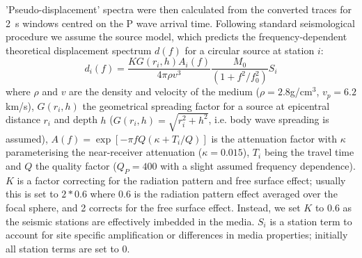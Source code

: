 \documentclass[reviewcopy]{elsart}
\begin{document}
'Pseudo-displacement' spectra were then calculated from the converted traces for 2~s windows
centred on the P wave arrival time.  Following standard seismological
procedure we assume the \citet{brune70} source model, which predicts
the frequency-dependent theoretical displacement spectrum $d(f)$ for a circular source at
station $i$:
\begin{equation}
d_i(f)=\frac{K G(r_i,h) A_i(f)}{4 \pi \rho v^3} \frac{M_0}{(1+f^2/f_0^2)}  S_i
\end{equation}
where $\rho$ and $v$ are the density and velocity of the medium
($\rho=2.8$g/cm$^3$, $v_p=6.2$km/s), $G(r_i,h)$ the geometrical 
spreading factor for a source at epicentral distance $r_i$ and depth
$h$ ($G(r_i,h)=\sqrt{r_i^2+h^2}$, i.e. body wave spreading is assumed),
$A(f)=\exp[-\pi f Q (\kappa + T_i / Q)]$ is the attenuation factor with 
$\kappa$ parameterising the near-receiver attenuation ($\kappa=0.015$),
$T_i$ being the travel time and $Q$ the quality factor ($Q_P=400$ with a
slight assumed frequency dependence). $K$ is a factor correcting for the
radiation pattern and free surface effect; usually this is set to
$2*0.6$ where 0.6 is the radiation pattern effect averaged over the
focal sphere, and 2 corrects for the free surface effect.  Instead, we
set $K$ to 0.6 as the seismic stations are effectively imbedded in the
media.  $S_i$ is a station term to account for site specific
amplification or differences in media properties; initially all
station terms are set to 0. 
\end{document}

